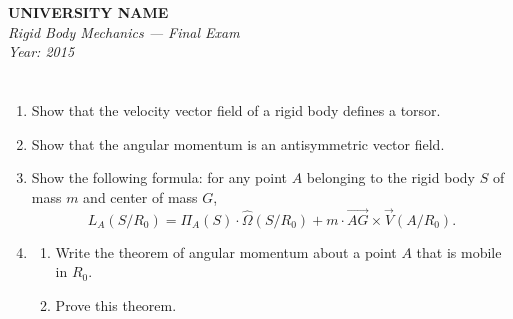 \documentclass[12pt]{article}
\begin{document}
\begin{center}
  \Large\textbf{UNIVERSITY NAME} \\[1em]
  \large\textit{Rigid Body Mechanics — Final Exam} \\[0.5em]
  \large\textit{Year: 2015} \\[2em]
\end{center}

\vspace{0.5cm}

\section{}
\begin{enumerate}
    \item Show that the velocity vector field of a rigid body defines a torsor.
    
    \item Show that the angular momentum is an antisymmetric vector field.
    
    \item Show the following formula: for any point \(A\) belonging to the rigid body \(S\) of mass \(m\) and center of mass \(G\),
    \[
    L_A(S/R_0) = \Pi_A(S) \cdot \hat{\Omega}(S/R_0) + m \cdot \overrightarrow{AG} \times \overrightarrow{V}(A/R_0).
    \]
    
    \item 
    \begin{enumerate}
        \item Write the theorem of angular momentum about a point \(A\) that is mobile in \(R_0\).
        \item Prove this theorem.
    \end{enumerate}
\end{enumerate}

\newpage
\end{document}
